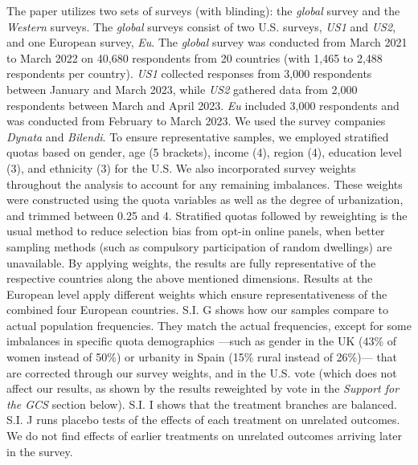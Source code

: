 \documentclass[12pt,english]{article}
\begin{document}
\begin{small}
The paper utilizes two sets of surveys (with blinding): the \textit{global} survey and the \textit{Western} surveys. The \textit{global} surveys consist of two U.S. surveys, \textit{US1} and \textit{US2}, and one European survey, \textit{Eu}. The \textit{global} survey was conducted from March 2021 to March 2022 on 40,680 respondents from 20 countries (with 1,465 to 2,488 respondents per country). \textit{US1} collected responses from 3,000 respondents between January and March 2023, while \textit{US2} gathered data from 2,000 respondents between March and April 2023. \textit{Eu} included 3,000 respondents and was conducted from February to March 2023. We used the survey companies \emph{Dynata} and \emph{Bilendi}. To ensure representative samples, we employed stratified quotas based on gender, age (5 brackets), income (4), region (4), education level (3), and ethnicity (3) for the U.S. We also incorporated survey weights throughout the analysis to account for any remaining imbalances. These weights were constructed using the quota variables as well as the degree of urbanization, and trimmed between 0.25 and 4. Stratified quotas followed by reweighting is the usual method to reduce selection bias from opt-in online panels, when better sampling methods (such as compulsory participation of random dwellings) are unavailable.\cite{scherpenzeel_how_2010} By applying weights, the results are fully representative of the respective countries along the above mentioned dimensions. %
Results at the European level apply different weights which ensure  representativeness of the combined four European countries. 
S.I. G 
shows how our samples compare to actual population frequencies. They match the actual frequencies, except for some imbalances in specific quota demographics ---such as gender in the UK (43\% of women instead of 50\%) or urbanity in Spain (15\% rural instead of 26\%)--- that are corrected through our survey weights, and in the U.S. vote (which does not affect our results, as shown by the results reweighted by vote in the \textit{Support for the GCS} section below). 
S.I. I 
shows that the treatment branches are balanced. 
S.I. J 
runs placebo tests of the effects of each treatment on unrelated outcomes. We do not find effects of earlier treatments on unrelated outcomes arriving later in the survey. 

\end{small}
\end{document}
